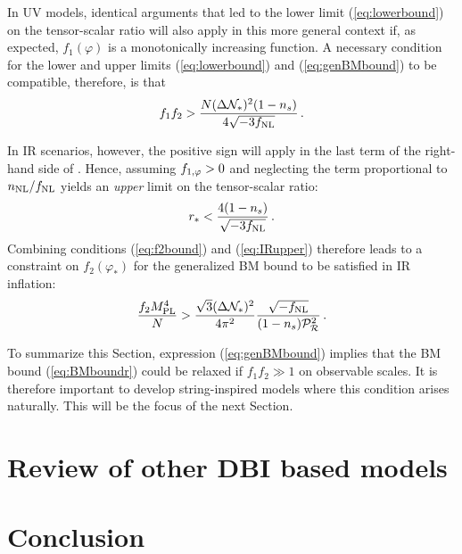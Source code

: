 In UV models, identical arguments that led to 
the lower limit (\ref{eq:lowerbound}) on the tensor-scalar ratio
will also apply in this more general context if, as expected, $f_1 (\varphi) $ 
is a monotonically increasing function. A necessary condition for
the lower and upper limits
(\ref{eq:lowerbound}) and (\ref{eq:genBMbound}) to be compatible, therefore, is  
that  
% 
\begin{equation}
\label{eq:evade}
f_1f_2 > \frac{N (\Delta \mathcal{N}_*)^2 (1-n_s)}{4\sqrt{-3f_{\mathrm{NL}}}} \,.
\end{equation}
% 


In IR scenarios, however, the positive sign will apply in the 
last term of the right-hand side of .
Hence, assuming $f_{1,\varphi} >0$ and neglecting the term proportional to 
$n_{\mathrm{NL}}/f_{\mathrm{NL}}$ yields an {\em upper} limit on the tensor-scalar ratio:
% 
\begin{equation}
\label{eq:IRupper}
r_* < \frac{4(1-n_s)}{\sqrt{-3f_{\mathrm{NL}}}}  \,.
\end{equation}
% 
Combining conditions (\ref{eq:f2bound}) and (\ref{eq:IRupper}) 
therefore leads to a constraint on $f_2 (\varphi_*) $
for the generalized BM bound to be satisfied in IR inflation: 
% 
\begin{equation}
\label{eq:f2IRlower}
\frac{f_2M_{\mathrm{PL}}^4}{N} > \frac{\sqrt{3} (\Delta \mathcal{N}_*)^2}{4\pi^2}
\frac{\sqrt{-f_{\mathrm{NL}}}}{(1-n_s)\mathcal{P}_{\mathcal{R}}^2 }  \,.
\end{equation}
% 


To summarize this Section, 
expression (\ref{eq:genBMbound}) implies that the 
BM bound (\ref{eq:BMboundr}) 
could be relaxed if $f_1f_2 \gg 1$ on observable scales. 
It is therefore important to develop string-inspired models 
where this condition arises naturally. This will be the focus of the 
next Section.
% 
% 
% 
% 
\section{Review of other DBI based models} 

\label{sec:others-dbi}

% 
% 
% 
% 
% 
% 
\section{Conclusion} 
\label{sec:conclusion-dbi}

